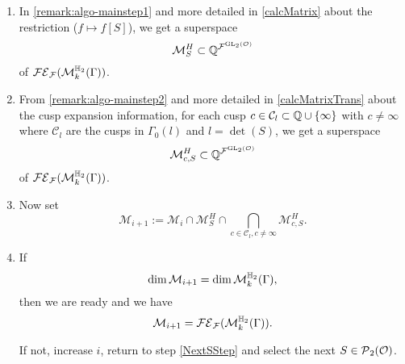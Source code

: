 \begin{algo}
\begin{enumerate}
\item
In \cref{remark:algo-mainstep1} and more detailed in \cref{calcMatrix} about the restriction ($f \mapsto f[S]$), we get a superspace
\[ \mathcal{M}^H_S \subset \mathbb{Q}^{{\mathcal{F}}^{\operatorname{GL}_2(\mathcal{O})}} \]
of $\mathcal{FE}_{\mathcal{F}}(\operatorname{\mathcal{M}}^{\mathbb{H}_{2}}_{k} (\Gamma))$.

\item
From \cref{remark:algo-mainstep2} and more detailed in \cref{calcMatrixTrans} about the cusp expansion information, for each cusp $c \in \mathcal{C}_l \subset {\Q \cup \Set{\infty}}$ with $c \ne \infty$ where $\mathcal{C}_l$ are the cusps in $\Gamma_0(l)$ and $l = \det(S)$, we get a superspace
\[ \mathcal{M}^H_{c,S} \subset \mathbb{Q}^{{\mathcal{F}}^{\operatorname{GL}_2(\mathcal{O})}} \]
of $\mathcal{FE}_{\mathcal{F}}(\operatorname{\mathcal{M}}^{\mathbb{H}_{2}}_{k} (\Gamma))$.

\item
Now set
\[ \mathcal{M}_{i+1} := \mathcal{M}_i \cap \mathcal{M}^H_S \cap \bigcap_{c \in \mathcal{C}_l, c \ne \infty} \mathcal{M}^H_{c,S} . \]
%
%
%
%
%

\item
If
\[ \dim \mathcal{M}_{i+1} = \dim \operatorname{\mathcal{M}}^{\mathbb{H}_{2}}_{k} (\Gamma) , \]
then we are ready and we have
\[ \mathcal{M}_{i+1} = \mathcal{FE}_{\mathcal{F}}(\operatorname{\mathcal{M}}^{\mathbb{H}_{2}}_{k} (\Gamma)) . \]

If not, increase $i$, return to step \ref{NextSStep} and select the next $S \in \operatorname{\mathcal{P}}_2(\mathcal{O})$.
\end{enumerate}
\end{algo}

